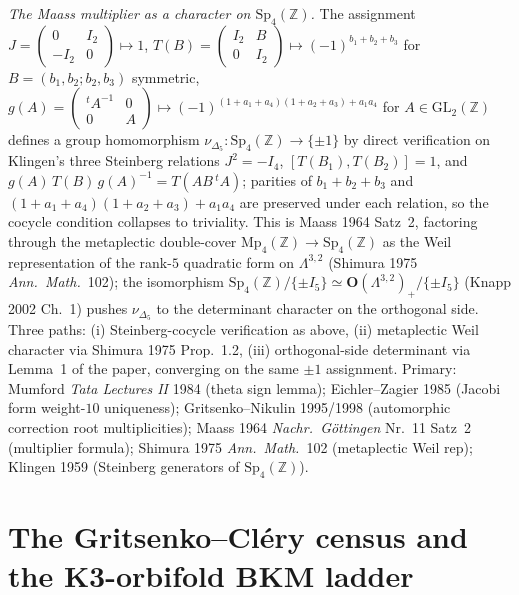 \begin{remark}
\emph{The Maass multiplier as a character on
$\mathrm{Sp}_4(\mathbb{Z})$.} The assignment
$J = \begin{pmatrix} 0 & I_2 \\ -I_2 & 0\end{pmatrix} \mapsto 1$,
$T(B) = \begin{pmatrix} I_2 & B \\ 0 & I_2\end{pmatrix} \mapsto
 (-1)^{b_1 + b_2 + b_3}$ for $B = (b_1, b_2; b_2, b_3)$ symmetric,
$g(A) = \begin{pmatrix}{}^tA^{-1} & 0\\ 0 & A\end{pmatrix} \mapsto
 (-1)^{(1+a_1+a_4)(1+a_2+a_3)+a_1 a_4}$ for $A \in \mathrm{GL}_2(\mathbb{Z})$
defines a group homomorphism
$\nu_{\Delta_5} \colon \mathrm{Sp}_4(\mathbb{Z}) \to \{\pm 1\}$
by direct verification on Klingen's three Steinberg relations
$J^2 = -I_4$, $[T(B_1),T(B_2)] = 1$, and
$g(A)\,T(B)\,g(A)^{-1} = T(A B\,{}^tA)$; parities of
$b_1+b_2+b_3$ and $(1+a_1+a_4)(1+a_2+a_3)+a_1 a_4$ are preserved under
each relation, so the cocycle condition collapses to triviality.
This is Maass 1964 Satz~2, factoring through the metaplectic
double-cover $\mathrm{Mp}_4(\mathbb{Z}) \to \mathrm{Sp}_4(\mathbb{Z})$
as the Weil representation of the rank-$5$ quadratic form on
$\Lambda^{3,2}$ (Shimura 1975 \emph{Ann.~Math.}~102); the
isomorphism
$\mathrm{Sp}_4(\mathbb{Z})/\{\pm I_5\} \simeq
 \mathbf{O}(\Lambda^{3,2})_+/\{\pm I_5\}$
(Knapp 2002 Ch.~1) pushes $\nu_{\Delta_5}$ to the determinant
character on the orthogonal side. Three paths:
(i) Steinberg-cocycle verification as above,
(ii) metaplectic Weil character via Shimura 1975 Prop.~1.2,
(iii) orthogonal-side determinant via Lemma~1 of the paper,
converging on the same $\pm 1$ assignment.
Primary: Mumford \emph{Tata Lectures II} 1984 (theta sign lemma);
Eichler--Zagier 1985 (Jacobi form weight-$10$ uniqueness);
Gritsenko--Nikulin 1995/1998 (automorphic correction root
multiplicities);
Maass 1964 \emph{Nachr.~G\"ottingen} Nr.~11 Satz~2
(multiplier formula);
Shimura 1975 \emph{Ann.~Math.}~102 (metaplectic Weil rep);
Klingen 1959 (Steinberg generators of $\mathrm{Sp}_4(\mathbb{Z})$).
\end{remark}

\section{The Gritsenko--Cl\'ery census and the K3-orbifold BKM ladder}
\label{sec:gritsenko-clery-orbifold-ladder}

